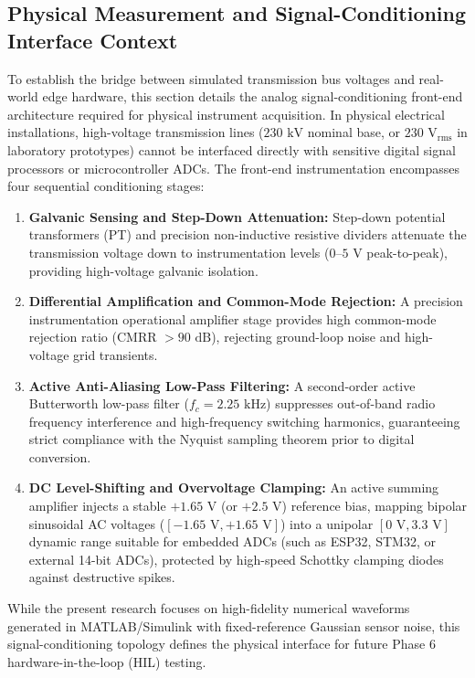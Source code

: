 \documentclass[12pt,a4paper]{report}
\begin{document}
\subsection{Physical Measurement and Signal-Conditioning Interface Context}
To establish the bridge between simulated transmission bus voltages and real-world edge hardware, this section details the analog signal-conditioning front-end architecture required for physical instrument acquisition. In physical electrical installations, high-voltage transmission lines ($230\text{ kV}$ nominal base, or $230\text{ V}_{\text{rms}}$ in laboratory prototypes) cannot be interfaced directly with sensitive digital signal processors or microcontroller ADCs. The front-end instrumentation encompasses four sequential conditioning stages:
\begin{enumerate}
    \item \textbf{Galvanic Sensing and Step-Down Attenuation:} Step-down potential transformers (PT) and precision non-inductive resistive dividers attenuate the transmission voltage down to instrumentation levels ($0\text{--}5\text{ V}$ peak-to-peak), providing high-voltage galvanic isolation.
    \item \textbf{Differential Amplification and Common-Mode Rejection:} A precision instrumentation operational amplifier stage provides high common-mode rejection ratio (CMRR $>90\text{ dB}$), rejecting ground-loop noise and high-voltage grid transients.
    \item \textbf{Active Anti-Aliasing Low-Pass Filtering:} A second-order active Butterworth low-pass filter ($f_c = 2.25\text{ kHz}$) suppresses out-of-band radio frequency interference and high-frequency switching harmonics, guaranteeing strict compliance with the Nyquist sampling theorem prior to digital conversion.
    \item \textbf{DC Level-Shifting and Overvoltage Clamping:} An active summing amplifier injects a stable $+1.65\text{ V}$ (or $+2.5\text{ V}$) reference bias, mapping bipolar sinusoidal AC voltages ($[-1.65\text{ V}, +1.65\text{ V}]$) into a unipolar $[0\text{ V}, 3.3\text{ V}]$ dynamic range suitable for embedded ADCs (such as ESP32, STM32, or external 14-bit ADCs), protected by high-speed Schottky clamping diodes against destructive spikes.
\end{enumerate}
While the present research focuses on high-fidelity numerical waveforms generated in MATLAB/Simulink with fixed-reference Gaussian sensor noise, this signal-conditioning topology defines the physical interface for future Phase 6 hardware-in-the-loop (HIL) testing.
\end{document}
